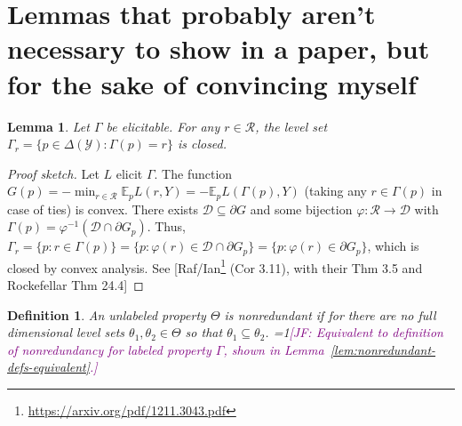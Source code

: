 \documentclass[12pt]{article}
\newcommand{\Comments}{1}
\newcommand{\mynote}[2]{\ifnum\Comments=1\textcolor{#1}{#2}\fi}
\newcommand{\mytodo}[2]{\ifnum\Comments=1%
  \todo[linecolor=#1!80!black,backgroundcolor=#1,bordercolor=#1!80!black]{#2}\fi}
\newcommand{\raft}[1]{\mytodo{green!20!white}{RF: #1}}
\newcommand{\jessie}[1]{\mynote{purple}{[JF: #1]}}
\newcommand{\D}{\mathcal{D}}
\newcommand{\E}{\mathbb{E}}
\newcommand{\R}{\mathcal{R}}
\newcommand{\Y}{\mathcal{Y}}
\newtheorem{lemma}{Lemma}
\newtheorem{definition}{Definition}
\begin{document}
%
%
%



\section{Lemmas that probably aren't necessary to show in a paper, but for the sake of convincing myself}

\begin{lemma}\label{lem:closed-level-sets}
	Let $\Gamma$ be elicitable.
	For any $r\in\R$, the level set $\Gamma_r = \{ p \in \Delta(\Y) : \Gamma(p) = r \}$ is closed.
\end{lemma}
\begin{proof}[Proof sketch]
	Let $L$ elicit $\Gamma$.
	The function $G(p) = -\min_{r\in\R} \E_p L(r,Y) = -\E_p L(\Gamma(p),Y)$ (taking any $r\in\Gamma(p)$ in case of ties) is convex.
	There exists $\D \subseteq \partial G$ and some bijection $\varphi : \R \to \D$ with $\Gamma(p) = \varphi^{-1}(\D\cap \partial G_p)$.
	Thus, $\Gamma_r = \{p : r\in\Gamma(p)\} = \{p : \varphi(r) \in \D\cap\partial G_p\} = \{p : \varphi(r) \in \partial G_p\}$, which is closed by convex analysis.
	See [Raf/Ian\footnote{\url{https://arxiv.org/pdf/1211.3043.pdf}} (Cor 3.11), with their Thm 3.5 and Rockefellar Thm 24.4]  
\end{proof}


\begin{definition}\label{def:unlabeled-nonredundant}
	An unlabeled property $\Theta$ is \emph{nonredundant} if for there are no full dimensional level sets $\theta_1, \theta_2 \in \Theta$ so that $\theta_1 \subseteq \theta_2$.
	\jessie{Equivalent to definition of nonredundancy for labeled property $\Gamma$, shown in Lemma~\ref{lem:nonredundant-defs-equivalent}.}
\end{definition}
\end{document}
